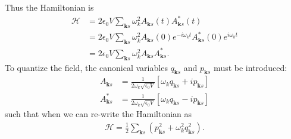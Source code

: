 \documentclass{book}
\theoremstyle{definition}
\newcommand{\ham}{\mathcal{H}}
\newcommand{\f}[2]{\frac{#1}{#2}}
\newcommand{\lp}{\left(}
\newcommand{\rp}{\right)}
\begin{document}
Thus the Hamiltonian is
\begin{align}
\ham &= 2\epsilon_0 V \sum_{\mathbf{k}s} \omega^2_k A_{\mathbf{k}s}(t)A^*_{\mathbf{k}s}(t)\\
&= 2\epsilon_0 V \sum_{\mathbf{k}s} \omega^2_k A_{\mathbf{k}s}(0)e^{-i\omega_k t}A^*_{\mathbf{k}s}(0)e^{i\omega_k t}\\
&= 2\epsilon_0 V \sum_{\mathbf{k}s} \omega^2_k A_{\mathbf{k}s}A^*_{\mathbf{k}s}.
\end{align}
To quantize the field, the canonical variables $q_{\mathbf{k}s}$ and $p_{\mathbf{k}s}$ must be introduced:
\begin{align}
A_{\mathbf{k}s} &= \f{1}{2\omega_k \sqrt{\epsilon_0 V}}[\omega_k q_{\mathbf{k}s} + ip_{\mathbf{k}s}]\\
A^*_{\mathbf{k}s} &= \f{1}{2\omega_k \sqrt{\epsilon_0 V}}[\omega_k q_{\mathbf{k}s} - ip_{\mathbf{k}s}]
\end{align}
such that when we can re-write the Hamiltonian as
\begin{align}
\ham = \f{1}{2}\sum_{\mathbf{k}s} \lp p^2_{\mathbf{k}s} + \omega_k^2q_{\mathbf{k}s}^2\rp.
\end{align}
\end{document}
